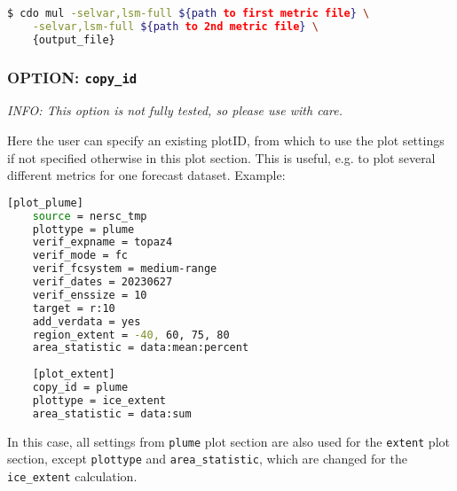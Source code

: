 \documentclass[DIV=10, parskip=full]{scrreprt}
\newcommand{\info}[1]{\textit{INFO: #1}}
\begin{document}
\begin{lstlisting}[language=bash]
	$ cdo mul -selvar,lsm-full ${path to first metric file} \
	-selvar,lsm-full ${path to 2nd metric file} \
	{output_file}
\end{lstlisting}

\subsubsection{OPTION: \texttt{copy\_id}}
\info{This option is not fully tested, so please use with care.}

Here the user can specify an existing plotID, from which to use the plot settings if not specified otherwise in this plot section. This is useful, e.g. to plot several different metrics for one forecast dataset. Example:

\begin{lstlisting}[language=bash]
	[plot_plume]
	source = nersc_tmp   
	plottype = plume 
	verif_expname = topaz4 
	verif_mode = fc
	verif_fcsystem = medium-range
	verif_dates = 20230627
	verif_enssize = 10
	target = r:10
	add_verdata = yes
	region_extent = -40, 60, 75, 80
	area_statistic = data:mean:percent
	
	[plot_extent]
	copy_id = plume
	plottype = ice_extent 
	area_statistic = data:sum
\end{lstlisting}

In this case, all settings from \texttt{plume} plot section are also used for the \texttt{extent} plot section, except \texttt{plottype} and \texttt{area\_statistic}, which are changed for the \texttt{ice\_extent} calculation. 
\end{document}
